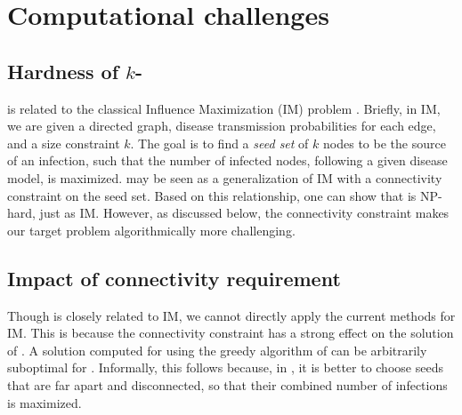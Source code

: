 

\section{Computational challenges}

\subsection{Hardness of $k$-\maxcrit{}}


\maxcrit{} is related to the classical Influence Maximization (IM) problem \cite{kempe:sigkdd03}. Briefly, in IM, we are given a directed graph, disease transmission probabilities for each edge, and a size constraint $k$. The goal is to find a \emph{seed set} of $k$ nodes to be the source of an infection, such that the number of infected nodes, following a given disease model, is maximized. \maxcrit{} may be seen as a generalization of IM with a connectivity constraint on the seed set. %
Based on this relationship, one can show that \maxcrit{} is NP-hard, just as IM. However, as discussed below, the connectivity constraint makes our target problem algorithmically more challenging.


\subsection{Impact of connectivity requirement}
Though \maxcrit{} is closely related to IM, we cannot directly apply the current methods for IM. This is because the connectivity constraint has a strong effect on the solution of \maxcrit{}. A solution computed for \infmax{} using the greedy algorithm of \cite{kempe:sigkdd03} can be arbitrarily suboptimal for \maxcrit{}. Informally, this follows because, in \infmax{}, it is better to choose seeds that are far apart and disconnected, so that their combined number of infections is maximized.

